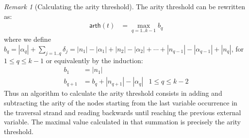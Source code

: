 \documentclass{article}
\theoremstyle{plain}
\theoremstyle{definition}
\theoremstyle{remark}
\newtheorem{remark}{Remark}[section]
\newcommand\arth{\textsf{arth}} %
\begin{document}
\begin{remark}[Calculating the arity threshold]
The arity threshold can be rewritten as:
\begin{align*}
\arth(t) &= \max_{q=1..k-1} b_q
\end{align*}
where we define $b_q = |\alpha_q| + \sum_{j=1..q} \delta_j = |n_1| - |\alpha_1| + |n_2| - |\alpha_2| + \cdots + |n_{q-1}| - |\alpha_{q-1}| + |n_q|$, for $1\leq q\leq k-1$ or equivalently by the induction:
 \begin{align*}
 b_1 &= |n_1| \\
 b_{q+1} &= b_q + |n_{q+1}| - |\alpha_q| & \mbox{$1 \leq q \leq k-2$}
 \end{align*}
Thus an algorithm to calculate the arity threshold consists in adding and subtracting the arity of the nodes starting from the last variable occurrence in the traversal strand and reading backwards until reaching the previous external variable. The maximal value calculated in that summation is precisely the arity threshold.
\end{remark}
\end{document}

